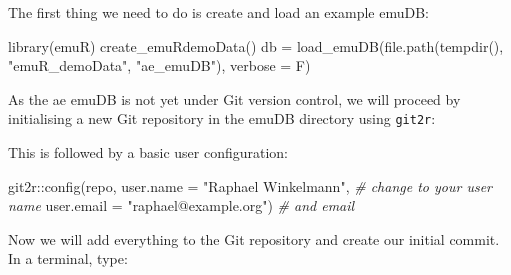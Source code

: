 \documentclass[
]{book}
\newenvironment{Shaded}{\begin{snugshade}}{\end{snugshade}}
\newcommand{\AttributeTok}[1]{\textcolor[rgb]{0.77,0.63,0.00}{#1}}
\newcommand{\CommentTok}[1]{\textcolor[rgb]{0.56,0.35,0.01}{\textit{#1}}}
\newcommand{\FunctionTok}[1]{\textcolor[rgb]{0.00,0.00,0.00}{#1}}
\newcommand{\NormalTok}[1]{#1}
\newcommand{\OtherTok}[1]{\textcolor[rgb]{0.56,0.35,0.01}{#1}}
\newcommand{\SpecialCharTok}[1]{\textcolor[rgb]{0.00,0.00,0.00}{#1}}
\newcommand{\StringTok}[1]{\textcolor[rgb]{0.31,0.60,0.02}{#1}}
\begin{document}
The first thing we need to do is create and load an example emuDB:

\begin{Shaded}
\begin{Highlighting}[]
\FunctionTok{library}\NormalTok{(emuR)}
\FunctionTok{create\_emuRdemoData}\NormalTok{()}
\NormalTok{db }\OtherTok{=} \FunctionTok{load\_emuDB}\NormalTok{(}\FunctionTok{file.path}\NormalTok{(}\FunctionTok{tempdir}\NormalTok{(),}
                          \StringTok{"emuR\_demoData"}\NormalTok{,}
                          \StringTok{"ae\_emuDB"}\NormalTok{),}
                \AttributeTok{verbose =}\NormalTok{ F)}
\end{Highlighting}
\end{Shaded}

As the ae emuDB is not yet under Git version control, we will proceed by initialising a new Git repository in the emuDB directory using \texttt{git2r}:

\begin{Shaded}
\end{Shaded}

This is followed by a basic user configuration:

\begin{Shaded}
\begin{Highlighting}[]
\NormalTok{git2r}\SpecialCharTok{::}\FunctionTok{config}\NormalTok{(repo, }
              \AttributeTok{user.name =} \StringTok{"Raphael Winkelmann"}\NormalTok{, }\CommentTok{\# change to your user name}
              \AttributeTok{user.email =} \StringTok{"raphael@example.org"}\NormalTok{) }\CommentTok{\# and email}
\end{Highlighting}
\end{Shaded}

Now we will add everything to the Git repository and create our initial commit. In a terminal, type:

\begin{Shaded}
\end{Shaded}
\end{document}

